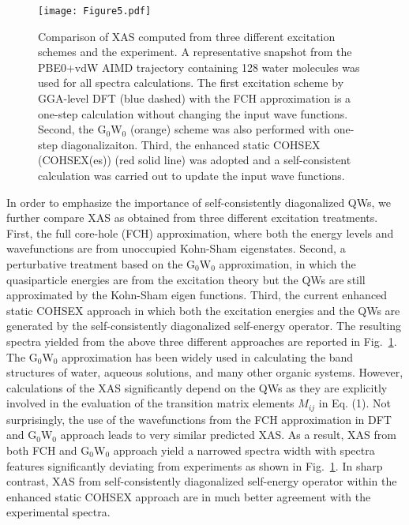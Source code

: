 \documentclass[prb,twocolumn,showpacs,preprintnumbers,superscriptaddress,amsmath,amssymb]{revtex4}
\begin{document}
\begin{figure}
  \texttt{[image: Figure5.pdf]}
  \caption{Comparison of XAS computed from three different excitation schemes
and the experiment.\cite{schreck2016isotope}
A representative snapshot from the PBE0+vdW AIMD trajectory
containing 128 water molecules was used for all spectra calculations.
The first excitation scheme by GGA-level DFT (blue dashed) with the FCH approximation is a one-step
calculation without changing the input wave functions.
Second, the G$_0$W$_0$ (orange) scheme was also performed with one-step diagonalizaiton.
Third, the enhanced static COHSEX (COHSEX(es)) (red solid line) was adopted
and a self-consistent calculation was carried out to update the input wave functions.
}
  \label{figscfGW}
\end{figure}


In order to emphasize the importance of self-consistently diagonalized QWs,
we further compare XAS as obtained from three different excitation treatments.
First, the full core-hole (FCH) approximation,
where both the energy levels and wavefunctions are from unoccupied Kohn-Sham eigenstates.
Second, a perturbative treatment based on the G$_0$W$_0$ approximation, in which the quasiparticle energies
are from the excitation theory but the QWs are still approximated by the Kohn-Sham eigen functions.
Third, the current enhanced static COHSEX approach in which
both the excitation energies and the QWs are generated by the self-consistently diagonalized self-energy operator.
The resulting spectra yielded from the above three different approaches are reported in Fig.~\ref{figscfGW}.
The G$_0$W$_0$ approximation has been widely used in calculating the
band structures of water,\cite{pham2014probing} aqueous solutions,\cite{opalka2014ionization} and many other
organic systems.\cite{blase2011first,marom2012benchmark,droghetti2014electronic,korzdorfer2012strategy,knight2016accurate,van2015gw}
However, calculations of the XAS significantly depend on the QWs as they are explicitly
involved in the evaluation of the transition matrix elements $M_{ij}$ in Eq. (1).
Not surprisingly, the use of the wavefunctions from the FCH approximation in DFT and G$_0$W$_0$ approach
leads to very similar predicted XAS.
As a result, XAS from both FCH and G$_0$W$_0$ approach yield a narrowed spectra width with spectra features significantly deviating from experiments as shown in Fig.~\ref{figscfGW}.
In sharp contrast, XAS from
self-consistently diagonalized self-energy operator within the enhanced static COHSEX approach are in
much better agreement with the experimental spectra.
\end{document}
